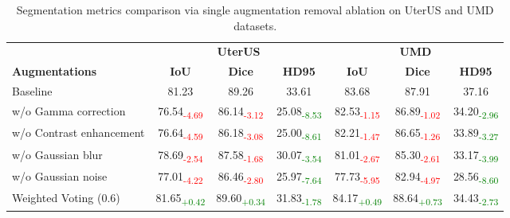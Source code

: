 \documentclass{article}
\newcommand{\uterusRmGammaIoU}{-4.69}
\newcommand{\uterusRmGammaDice}{-3.12}
\newcommand{\uterusRmGammaHD}{-8.53}
\newcommand{\umdRmGammaIoU}{-1.15}
\newcommand{\umdRmGammaDice}{-1.02}
\newcommand{\umdRmGammaHD}{-2.96}
\newcommand{\uterusRmContrastIoU}{-4.59}
\newcommand{\uterusRmContrastDice}{-3.08}
\newcommand{\uterusRmContrastHD}{-8.61}
\newcommand{\umdRmContrastIoU}{-1.47}
\newcommand{\umdRmContrastDice}{-1.26}
\newcommand{\umdRmContrastHD}{-3.27}
\newcommand{\uterusRmBlurIoU}{-2.54}
\newcommand{\uterusRmBlurDice}{-1.68}
\newcommand{\uterusRmBlurHD}{-3.54}
\newcommand{\umdRmBlurIoU}{-2.67}
\newcommand{\umdRmBlurDice}{-2.61}
\newcommand{\umdRmBlurHD}{-3.99}
\newcommand{\uterusRmNoiseIoU}{-4.22}
\newcommand{\uterusRmNoiseDice}{-2.80}
\newcommand{\uterusRmNoiseHD}{-7.64}
\newcommand{\umdRmNoiseIoU}{-5.95}
\newcommand{\umdRmNoiseDice}{-4.97}
\newcommand{\umdRmNoiseHD}{-8.60}
\newcommand{\uterusVoteIoUDelta}{+0.42}
\newcommand{\uterusVoteDiceDelta}{+0.34}
\newcommand{\uterusVoteHDDelta}{-1.78}
\newcommand{\umdVoteIoUDelta}{+0.49}
\newcommand{\umdVoteDiceDelta}{+0.73}
\newcommand{\umdVoteHDDelta}{-2.73}
\begin{document}
\begin{table}[!t]
\centering
\caption{Segmentation metrics comparison via single augmentation removal ablation on UterUS\cite{bones2024uterus} and UMD\cite{umd2024} datasets.}
\begin{tabular}{lccc|ccc}
\toprule
 & \multicolumn{3}{c}{\textbf{UterUS}} & \multicolumn{3}{c}{\textbf{UMD}} \\
\cmidrule(lr){2-4} 
\cmidrule(lr){5-7} 
 \textbf{Augmentations} & \textbf{IoU} & \textbf{Dice} & \textbf{HD95} & \textbf{IoU} & \textbf{Dice} & \textbf{HD95} \\
\midrule
Baseline & 81.23 & 89.26 & 33.61 & 83.68 & 87.91 & 37.16 \\
w/o Gamma correction  
         & 76.54\textsubscript{\textcolor{red}{\uterusRmGammaIoU}} 
         & 86.14\textsubscript{\textcolor{red}{\uterusRmGammaDice}} 
         & 25.08\textsubscript{\textcolor{green}{\uterusRmGammaHD}} 
         & 82.53\textsubscript{\textcolor{red}{\umdRmGammaIoU}}
         & 86.89\textsubscript{\textcolor{red}{\umdRmGammaDice}}
         & 34.20\textsubscript{\textcolor{green}{\umdRmGammaHD}}\\
w/o Contrast enhancement 
         & 76.64\textsubscript{\textcolor{red}{\uterusRmContrastIoU}} 
         & 86.18\textsubscript{\textcolor{red}{\uterusRmContrastDice}} 
         & 25.00\textsubscript{\textcolor{green}{\uterusRmContrastHD}}
         & 82.21\textsubscript{\textcolor{red}{\umdRmContrastIoU}}
         & 86.65\textsubscript{\textcolor{red}{\umdRmContrastDice}}
         & 33.89\textsubscript{\textcolor{green}{\umdRmContrastHD}}\\
w/o Gaussian blur 
         & 78.69\textsubscript{\textcolor{red}{\uterusRmBlurIoU}} 
         & 87.58\textsubscript{\textcolor{red}{\uterusRmBlurDice}} 
         & 30.07\textsubscript{\textcolor{green}{\uterusRmBlurHD}}
         & 81.01\textsubscript{\textcolor{red}{\umdRmBlurIoU}}
         & 85.30\textsubscript{\textcolor{red}{\umdRmBlurDice}}
         & 33.17\textsubscript{\textcolor{green}{\umdRmBlurHD}}\\
w/o Gaussian noise 
         & 77.01\textsubscript{\textcolor{red}{\uterusRmNoiseIoU}} 
         & 86.46\textsubscript{\textcolor{red}{\uterusRmNoiseDice}} 
         & 25.97\textsubscript{\textcolor{green}{\uterusRmNoiseHD}}
         & 77.73\textsubscript{\textcolor{red}{\umdRmNoiseIoU}}
         & 82.94\textsubscript{\textcolor{red}{\umdRmNoiseDice}}
         & 28.56\textsubscript{\textcolor{green}{\umdRmNoiseHD}}\\
\midrule
Weighted Voting (0.6)
         & 81.65\textsubscript{\textcolor{green}{\uterusVoteIoUDelta}} 
         & 89.60\textsubscript{\textcolor{green}{\uterusVoteDiceDelta}} 
         & 31.83\textsubscript{\textcolor{green}{\uterusVoteHDDelta}}
         & 84.17\textsubscript{\textcolor{green}{\umdVoteIoUDelta}}
         & 88.64\textsubscript{\textcolor{green}{\umdVoteDiceDelta}}
         & 34.43\textsubscript{\textcolor{green}{\umdVoteHDDelta}}\\
\bottomrule
\end{tabular}
\label{tab:Augmentation_ablation}
\end{table}
\end{document}
